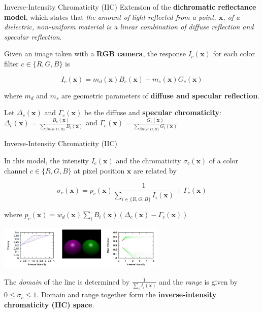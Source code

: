 \begin{tframe}{Inverse-Intensity Chromaticity (IIC)}
Extension of the \textbf{dichromatic reflectance model}, which states that \emph{the amount of light reflected from a point, $\textbf{x}$, of a dielectric, non-uniform material is a linear combination of diffuse reflection and specular reflection}.

\vspace{0.2cm}

Given an image taken with a \textbf{RGB camera}, the response $I_c(\textbf{x})$ for each color filter $c \in \{R, G, B\}$ is

$$
I_c(\textbf{x}) = m_d(\textbf{x})B_c(\textbf{x}) + m_s(\textbf{x})G_c(\textbf{x})
$$

\begin{small}
where $m_d$ and $m_s$ are geometric parameters of \textbf{diffuse and specular reflection}.
\vspace{0.2cm}

Let $\Delta_c(\textbf{x})$ and $\Gamma_c(\textbf{x})$ be the diffuse and \textbf{specular chromaticity}: $\Delta_c(\textbf{x}) = \frac{B_c(\textbf{x})}{\sum_{i in \{R, G, B\}} B_i(\textbf{x})}$ and $\Gamma_c(\textbf{x}) = \frac{G_c(\textbf{x})}{\sum_{i in \{R, G, B\}} G_i(\textbf{x})}$
\end{small}

\end{tframe}

\begin{tframe}{Inverse-Intensity Chromaticity (IIC)}

In this model, the intensity $I_c(\textbf{x})$ and the chromaticity $\sigma_c(\textbf{x})$ of a color channel $c \in \{R, G, B\}$ at pixel position $\textbf{x}$ are related by

\begin{equation}
\sigma_c(\textbf{x}) = p_c(\textbf{x}) \frac{1}{\sum_{i \in \{R, G, B\}} I_i(\textbf{x})} + \Gamma_c(\textbf{x})
\end{equation}
\vspace{0.2cm}

\begin{small}
where $p_c(\textbf{x}) = w_d(\textbf{x}) \sum_i B_i(\textbf{x}) (\Delta_c(\textbf{x}) - \Gamma_c(\textbf{x}))$ 
\end{small}

\begin{center}
\includegraphics[width=0.6\textwidth]{images/iic.jpg}
\end{center}
The \emph{domain} of the line is determined by $\frac{1}{\sum_i I_i(\textbf{x})}$ and the \emph{range} is given by $0 \leq \sigma_c \leq 1$. Domain and range together form the \textbf{inverse-intensity chromaticity (IIC) space}.
\end{tframe}

